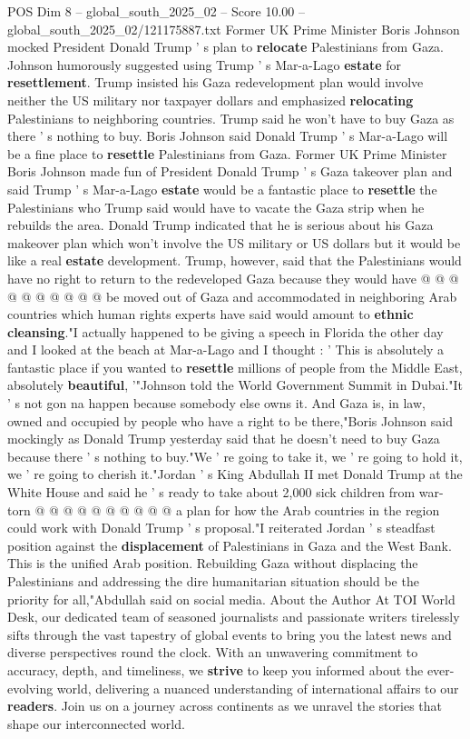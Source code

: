 \begin{textsample}{POS Dim 8 – global\_south\_2025\_02 – Score 10.00 – global\_south\_2025\_02/121175887.txt}  \label{ex:f8_pos_071}
Former UK Prime Minister Boris Johnson mocked President Donald Trump ' s plan to \textbf{relocate} Palestinians from Gaza.
Johnson humorously suggested using Trump ' s Mar-a-Lago \textbf{estate} for \textbf{resettlement}.
Trump insisted his Gaza redevelopment plan would involve neither the US military nor taxpayer dollars and emphasized \textbf{relocating} Palestinians to neighboring countries.
Trump said he won't have to buy Gaza as there ' s nothing to buy.
Boris Johnson said Donald Trump ' s Mar-a-Lago will be a fine place to \textbf{resettle} Palestinians from Gaza.
Former UK Prime Minister Boris Johnson made fun of President Donald Trump ' s Gaza takeover plan and said Trump ' s Mar-a-Lago \textbf{estate} would be a fantastic place to \textbf{resettle} the Palestinians who Trump said would have to vacate the Gaza strip when he rebuilds the area.
Donald Trump indicated that he is serious about his Gaza makeover plan which won't involve the US military or US dollars but it would be like a real \textbf{estate} development.
Trump, however, said that the Palestinians would have no right to return to the redeveloped Gaza because they would have @ @ @ @ @ @ @ @ @ @ be moved out of Gaza and accommodated in neighboring Arab countries which human rights experts have said would amount to \textbf{ethnic} \textbf{cleansing}."I actually happened to be giving a speech in Florida the other day and I looked at the beach at Mar-a-Lago and I thought : ' This is absolutely a fantastic place if you wanted to \textbf{resettle} millions of people from the Middle East, absolutely \textbf{beautiful}, '"Johnson told the World Government Summit in Dubai."It ' s not gon na happen because somebody else owns it.
And Gaza is, in law, owned and occupied by people who have a right to be there,"Boris Johnson said mockingly as Donald Trump yesterday said that he doesn't need to buy Gaza because there ' s nothing to buy."We ' re going to take it, we ' re going to hold it, we ' re going to cherish it."Jordan ' s King Abdullah II met Donald Trump at the White House and said he ' s ready to take about 2,000 sick children from war-torn @ @ @ @ @ @ @ @ @ @ a plan for how the Arab countries in the region could work with Donald Trump ' s proposal."I reiterated Jordan ' s steadfast position against the \textbf{displacement} of Palestinians in Gaza and the West Bank.
This is the unified Arab position.
Rebuilding Gaza without displacing the Palestinians and addressing the dire humanitarian situation should be the priority for all,"Abdullah said on social media.
About the Author At TOI World Desk, our dedicated team of seasoned journalists and passionate writers tirelessly sifts through the vast tapestry of global events to bring you the latest news and diverse perspectives round the clock.
With an unwavering commitment to accuracy, depth, and timeliness, we \textbf{strive} to keep you informed about the ever-evolving world, delivering a nuanced understanding of international affairs to our \textbf{readers}.
Join us on a journey across continents as we unravel the stories that shape our interconnected world.


\end{textsample}
